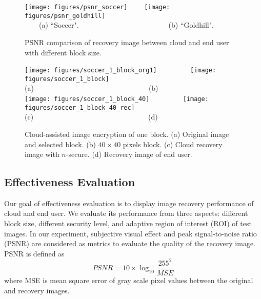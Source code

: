 \documentclass[conference]{IEEEtran}
\begin{document}
\begin{figure}[t]
\begin{center}
  \texttt{[image: figures/psnr\_soccer]}~~~~
  \texttt{[image: figures/psnr\_goldhill]}\\
  {\footnotesize ~~~~(a) ``Soccer".~~~~~~~~~~~~~~~~~~~~~~~~~(b) ``Goldhill".} \\
  \caption{{\footnotesize PSNR comparison of recovery image between cloud and end user with different block size. }}\label{f_psnr_diff_block_size}
 \end{center}
\end{figure}

\begin{figure}[t]
\begin{center}
  \texttt{[image: figures/soccer\_1\_block\_org1]} ~~~~~~~~
  \texttt{[image: figures/soccer\_1\_block]}\\
  {\footnotesize (a)~~~~~~~~~~~~~~~~~~~~~~~~~~~~~~~~(b)}\\
  \texttt{[image: figures/soccer\_1\_block\_40]} ~~~~~~~~
  \texttt{[image: figures/soccer\_1\_block\_40\_rec]}\\
  {\footnotesize (c)~~~~~~~~~~~~~~~~~~~~~~~~~~~~~~~~(d)} \\
  \caption{{\footnotesize Cloud-assisted image encryption of one block. (a) Original image and selected block. (b) $40\times 40$ pixels block. (c) Cloud recovery image with $n$-secure. (d) Recovery image of end user.}}\label{f_se_diff_1_block_size}
 \end{center}
\end{figure}

\subsection{Effectiveness Evaluation}
Our goal of effectiveness evaluation is to display image recovery performance of cloud and end user. We evaluate its performance from three aspects: different block size, different  security level, and adaptive region of interest (ROI) of test images. In our experiment, subjective visual effect and peak signal-to-noise ratio (PSNR) are considered as metrics to evaluate the quality of the recovery image. PSNR is defined as
\begin{equation*}
    PSNR=10\times \log_{10}\frac{255^2}{MSE}
\end{equation*}
where MSE is mean square error of gray scale pixel values between the original and recovery images.
\end{document}
